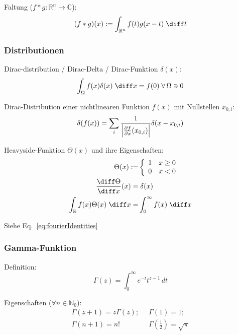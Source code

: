 \documentclass[11pt]{article}
\numberwithin{equation}{section}
\begin{document}
				\noindent
				Faltung ($f*g:\mathbb{R}^n \rightarrow \mathbb{C}$):
				\begin{equation}
					(f*g)(x) := \int_{\mathbb{R}^n} f(t) g(x-t)\;\diff t
				\end{equation}

			\subsubsection{Distributionen}
				\noindent
				Dirac-distribution / Dirac-Delta / Dirac-Funktion $\delta(x)$:
				\begin{equation}
					\int_\Omega f(x)\delta(x)\;\diff x = f(0)\;\forall\, \Omega\ni 0
				\end{equation}

				\noindent
				Dirac-Distribution einer nichtlinearen Funktion $f(x)$ mit Nullstellen $x_{0,i}$:
				\begin{equation}
					\delta(f(x)) = \sum_i \frac{1}{\left|\frac{\partial f}{\partial x}(x_{0,i})\right|}\delta(x-x_{0,i})
				\end{equation}

				\noindent
				Heavyside-Funktion $\Theta(x)$ und ihre Eigenschaften:
				\begin{equation}
					\begin{aligned}
						\Theta(x) :=& \left\{\begin{array}{ll}
							1 & x\ge 0 \\
							0 & x<0 \\
							\end{array}\right. \\
							\tder{\Theta}{x}(x) =&\; \delta(x) \\
						\int_{\mathbb{R}} f(x)\Theta(x)\;\diff x =& \int_{0}^{\infty} f(x)\;\diff x
					\end{aligned}
				\end{equation}

				\noindent
				Siehe Eq.~\ref{eq:fourierIdentities}

			\subsubsection{Gamma-Funktion}
				\noindent
				Definition:
				\begin{equation}
					\Gamma(z)=\int_0^{\infty}e^{-t}t^{z-1}\,dt
				\end{equation}

				\noindent
				Eigenschaften ($\forall n\in\mathbb{N}_0$):
				\begin{equation}
					\begin{array}{cc}
						\Gamma(z+1)=z\Gamma(z);
						&\;\; \Gamma\left(1 \right)=1; \\
						\Gamma(n+1) = n!
						&\;\; \Gamma\left(\frac{1}{2} \right)=\sqrt{\pi} \\
					\end{array}
				\end{equation}
\end{document}
